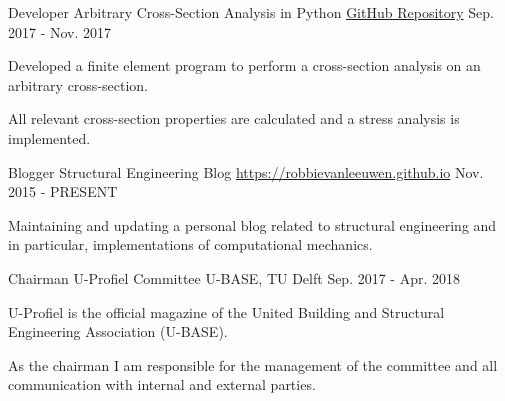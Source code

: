 

\begin{cventries}

  \cventry
    {Developer} %
    {Arbitrary Cross-Section Analysis in Python} %
    {\href{https://github.com/robbievanleeuwen/section-properties}{GitHub Repository}} %
    {Sep. 2017 - Nov. 2017} %
    {
      \begin{cvitems} %
        \item {Developed a finite element program to perform a cross-section analysis on an arbitrary cross-section.}
        \item {All relevant cross-section properties are calculated and a stress analysis is implemented.}
      \end{cvitems}
    }
 
  \cventry
    {Blogger} %
    {Structural Engineering Blog} %
    {\href{https://robbievanleeuwen.github.io}{https://robbievanleeuwen.github.io}} %
    {Nov. 2015 - PRESENT} %
    {
      \begin{cvitems} %
        \item {Maintaining and updating a personal blog related to structural engineering and in particular, implementations of computational mechanics.}
      \end{cvitems}
    }
    
     \cventry
    {Chairman} %
    {U-Profiel Committee} %
    {U-BASE, TU Delft} %
    {Sep. 2017 - Apr. 2018} %
    {
      \begin{cvitems} %
        \item {U-Profiel is the official magazine of the United Building and Structural Engineering Association (U-BASE).}
        \item {As the chairman I am responsible for the management of the committee and all communication with internal and external parties.}
      \end{cvitems}
    }

\end{cventries}
